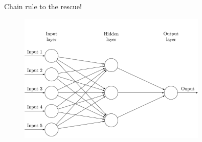 \documentclass{beamer}
\begin{document}
\begin{frame}{Chain rule to the rescue!}
    \begin{figure}
        \includegraphics[width=0.8\textwidth]{../assets/mlp_model.png}
    \end{figure}
\end{frame}

\printbibliography
\end{document}
